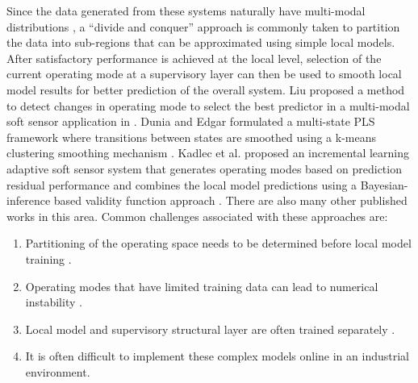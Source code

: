 \documentclass[review,3p]{elsarticle}
\renewcommand\[{\begin{equation}}
\renewcommand\]{\end{equation}}
\begin{document}
Since the data generated from these systems naturally have multi-modal
distributions \cite{Yu2008}, a ``divide and conquer'' approach is commonly
taken to partition the data into sub-regions that can be approximated using
simple local models. After satisfactory performance is achieved at the local
level, selection of the current operating mode at a supervisory layer can then be used to smooth local model
results for better prediction of the overall system. Liu proposed a method to detect changes in operating mode to select the best predictor in a multi-modal soft sensor application in \cite{Liu2016}. Dunia and Edgar
formulated a multi-state PLS framework where transitions between states are
smoothed using a k-means clustering smoothing mechanism \cite{Dunia2012}.
Kadlec et al. proposed an incremental learning adaptive soft sensor system
that generates operating modes based on prediction residual performance and
combines the local model predictions using a Bayesian-inference based
validity function approach \cite{Kadlec2011a}. There are also many other
published works in this area\cite{Liu2007,Liu2009,Lin2007,Eriksson2009}.
Common challenges associated with these approaches are:
\begin{enumerate}
\item Partitioning of the operating space needs to be determined before
    local model training \cite{Kadlec2011a, Dunia2012}.
\item Operating modes that have limited training data can lead to
    numerical instability \cite{Kadlec2011a, Eriksson2009}.
\item Local model and supervisory structural layer are often trained separately \cite{Dunia2012}.
\item It is often difficult to implement these complex models online in an industrial environment.
\end{enumerate}
\end{document}
